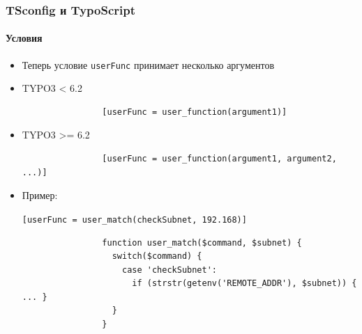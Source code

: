 \begin{frame}[fragile]
	\frametitle{TSconfig и TypoScript}
	\framesubtitle{Условия}

	\begin{itemize}
		\item Теперь условие \texttt{userFunc} принимает несколько аргументов

		\item TYPO3 < 6.2
			\begin{lstlisting}
				[userFunc = user_function(argument1)]
			\end{lstlisting}

		\item TYPO3 >= 6.2
			\begin{lstlisting}
				[userFunc = user_function(argument1, argument2, ...)]
			\end{lstlisting}

		\item Пример:

			\lstinline![userFunc = user_match(checkSubnet, 192.168)]!

			\begin{lstlisting}
				function user_match($command, $subnet) {
				  switch($command) {
				    case 'checkSubnet':
				      if (strstr(getenv('REMOTE_ADDR'), $subnet)) { ... }
				  }
				}
			\end{lstlisting}

	\end{itemize}

\end{frame}


